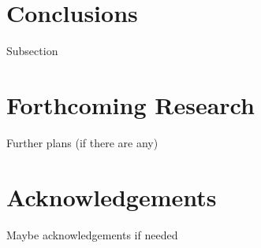 \documentclass[a0,portrait]{a0poster}
\begin{document}
\begin{multicols}{2}

\color{SaddleBrown} %

\section*{Conclusions}

Subsection

\color{DarkSlateGray} %


\section*{Forthcoming Research}

Further plans (if there are any)


\nocite{*} %


\section*{Acknowledgements}

Maybe acknowledgements if needed


\end{multicols}
\end{document}
